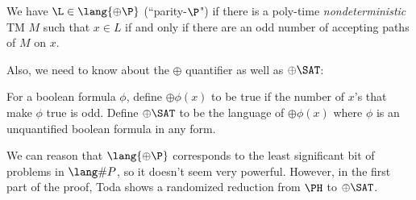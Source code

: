 \newcommand{\Parity}{\oplus}
\newcommand{\ParityP}{\lang{\Parity\P}}
\begin{definition}
We have $\L \in \ParityP$ (``parity-$\P$") if there is a poly-time \emph{nondeterministic} TM $M$ such that $x \in L$ if and only if there are an odd number of accepting paths of $M$ on $x$. 
\end{definition}
\newcommand{\ParitySAT}{\Parity\SAT}
Also, we need to know about the $\Parity$ quantifier as well as $\ParitySAT$:
\begin{definition}
For a boolean formula $\phi$, define $\Parity\phi(x)$ to be true if the number of $x$'s that make $\phi$ true is odd. Define $\ParitySAT$ to be the language of $\Parity\phi(x)$ where $\phi$ is an unquantified boolean formula in any form.
\end{definition}
We can reason that $\ParityP$ corresponds to the least significant bit of problems in $\SharpP$, so it doesn't seem very powerful. However, in the first part of the proof, Toda shows a randomized reduction from $\PH$ to $\ParitySAT$. 

